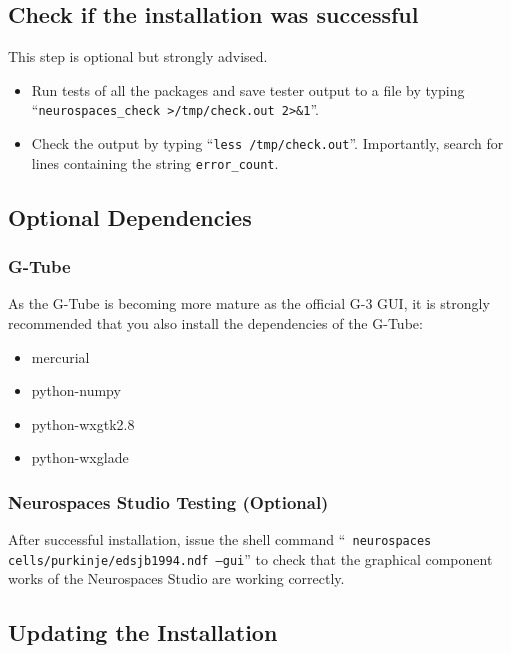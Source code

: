 \documentclass[12pt]{article}
\begin{document}
\subsection*{Check if the installation was successful}

This step is optional but strongly advised.

\begin{itemize}      
   \item[] Run tests of all the packages and save tester output to a file  by typing ``{\tt neurospaces\_check >/tmp/check.out 2>\&1}''.
   \item[] Check the output by typing ``{\tt less /tmp/check.out}''. Importantly, search for lines containing the string {\tt error\_count}.
\end{itemize}
    

\subsection*{Optional Dependencies}

\subsubsection*{G-Tube}

As the G-Tube is becoming more mature as the official G-3 GUI, it is
strongly recommended that you also install the dependencies of the G-Tube:

\begin{itemize}
\item mercurial
\item python-numpy
\item python-wxgtk2.8
\item python-wxglade
\end{itemize}

\subsubsection*{Neurospaces Studio Testing (Optional)}

After successful installation, issue the shell command ``{\tt
  neurospaces cells/purkinje/edsjb1994.ndf --gui}'' to check that the
graphical component works of the Neurospaces Studio are working
correctly.

\subsection*{Updating the Installation}
\end{document}

